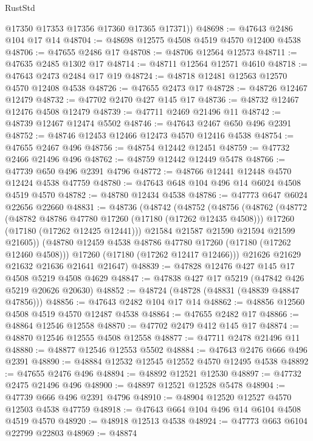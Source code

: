 \begin{lexlean}{RustStd}
\begin{coremodule}
        @17350
        @17353
        @17356
        @17360
        @17365
        @17371))
@48698 := @47643 @2486 @104 @17 @14
@48704 := @48698 @12575 @4508 @4519 @4570 @12400 @4538
@48706 := @47655 @2486 @17
@48708 := @48706 @12564 @12573
@48711 := @47635 @2485 @1302 @17
@48714 := @48711 @12564 @12571 @4610
@48718 := @47643 @2473 @2484 @17 @19
@48724 := @48718 @12481 @12563 @12570 @4570 @12408 @4538
@48726 := @47655 @2473 @17
@48728 := @48726 @12467 @12479
@48732 := @47702 @2470 @427 @145 @17
@48736 := @48732 @12467 @12476 @4508 @12479
@48739 := @47711 @2469 @21496 @11
@48742 := @48739 @12467 @12474 @5502
@48746 := @47643 @2467 @650 @496 @2391
@48752 := @48746 @12453 @12466 @12473 @4570 @12416 @4538
@48754 := @47655 @2467 @496
@48756 := @48754 @12442 @12451
@48759 := @47732 @2466 @21496 @496
@48762 := @48759 @12442 @12449 @5478
@48766 := @47739 @650 @496 @2391 @4796
@48772 := @48766 @12441 @12448 @4570 @12424 @4538 @47759
@48780 := @47643 @648 @104 @496 @14 @6024 @4508 @4519 @4570
@48782 := @48780 @12434 @4538
@48786 := @47773 @647 @6024 @22656 @22660
@48831 := @48736
    (@48742
      (@48752
        (@48756
          (@48762
            (@48772
              (@48782 @48786 @47780 @17260 (@17180 (@17262 @12435 @4508)))
              @17260
              (@17180 (@17262 @12425 @12441)))
            @21584
            @21587
            @21590
            @21594
            @21599
            @21605))
        (@48780 @12459 @4538 @48786 @47780 @17260 (@17180 (@17262 @12460 @4508)))
        @17260
        (@17180 (@17262 @12417 @12466)))
      @21626
      @21629
      @21632
      @21636
      @21641
      @21647)
@48839 := @47828 @12476 @427 @145 @17 @4508 @5219 @4508 @4629
@48847 := @47838 @427 @17 @5219 (@47842 @426 @5219 @20626 @20630)
@48852 := @48724 (@48728 (@48831 (@48839 @48847 @47856)))
@48856 := @47643 @2482 @104 @17 @14
@48862 := @48856 @12560 @4508 @4519 @4570 @12487 @4538
@48864 := @47655 @2482 @17
@48866 := @48864 @12546 @12558
@48870 := @47702 @2479 @412 @145 @17
@48874 := @48870 @12546 @12555 @4508 @12558
@48877 := @47711 @2478 @21496 @11
@48880 := @48877 @12546 @12553 @5502
@48884 := @47643 @2476 @666 @496 @2391
@48890 := @48884 @12532 @12545 @12552 @4570 @12495 @4538
@48892 := @47655 @2476 @496
@48894 := @48892 @12521 @12530
@48897 := @47732 @2475 @21496 @496
@48900 := @48897 @12521 @12528 @5478
@48904 := @47739 @666 @496 @2391 @4796
@48910 := @48904 @12520 @12527 @4570 @12503 @4538 @47759
@48918 := @47643 @664 @104 @496 @14 @6104 @4508 @4519 @4570
@48920 := @48918 @12513 @4538
@48924 := @47773 @663 @6104 @22799 @22803
@48969 := @48874

\end{coremodule}
\end{lexlean}
